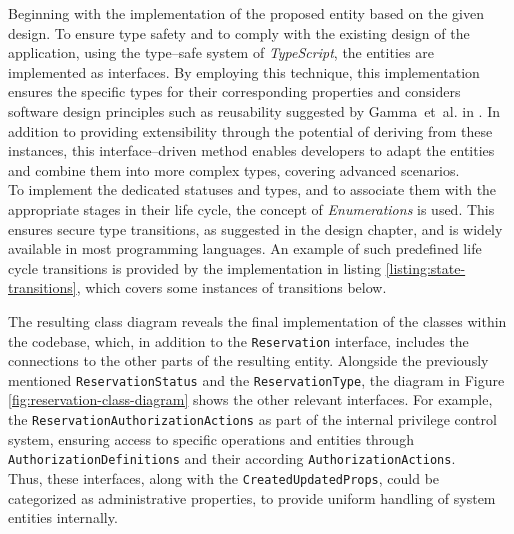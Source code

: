 Beginning with the implementation of the proposed entity based on the given design.
To ensure type safety and to comply with the existing design of the application, using the type--safe system of \textit{TypeScript}, the entities are implemented as interfaces.
By employing this technique, this implementation ensures the specific types for their corresponding properties and considers software design principles such as reusability suggested by Gamma~et~al. in \cite[p.~47ff]{gamma_design_2015}. 
In addition to providing extensibility through the potential of deriving from these instances, this interface--driven method enables developers to adapt the entities and combine them into more complex types, covering advanced scenarios. \\
\noindent To implement the dedicated statuses and types, and to associate them with the appropriate stages in their life cycle, the concept of \textit{Enumerations} is used. This ensures secure type transitions, as suggested in the design chapter, and is widely available in most programming languages.
An example of such predefined life cycle transitions is provided by the implementation in listing \ref{listing:state-transitions}, which covers some instances of transitions below. 



\noindent The resulting class diagram reveals the final implementation of the classes within the codebase, which, in addition to the \texttt{Reservation} interface, includes the connections to the other parts of the resulting entity.
Alongside the previously mentioned \texttt{ReservationStatus} and the \texttt{ReservationType}, the diagram in Figure \ref{fig:reservation-class-diagram} shows the other relevant interfaces. 
For example, the \texttt{ReservationAuthorizationActions} as part of the internal privilege control system, ensuring access to specific operations and entities through \texttt{AuthorizationDefinitions} and their according \texttt{AuthorizationActions}. \\
Thus, these interfaces, along with the \texttt{CreatedUpdatedProps}, could be categorized as administrative properties, to provide uniform handling of system entities internally.


